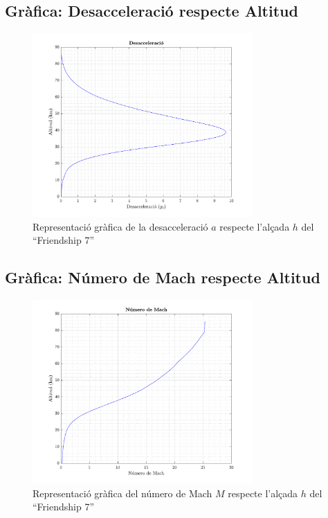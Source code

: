 \subsection{Gràfica: Desacceleració respecte Altitud}

\begin{figure}[h]
    \centering
    \includegraphics[width=0.75\textwidth]{imagenes/09_mercury_graficas/desacceleracio.pdf}
    \caption{Representació gràfica de la desacceleració $a$ respecte l'alçada $h$ del ``Friendship 7''}
    \label{fig:desacceleracio_merc}
\end{figure}


\newpage
\subsection{Gràfica: Número de Mach respecte Altitud}

\begin{figure}[h]
    \centering
    \includegraphics[width=0.75\textwidth]{imagenes/09_mercury_graficas/mach.pdf}
    \caption{Representació gràfica del número de Mach $M$ respecte l'alçada $h$ del ``Friendship 7''}
    \label{fig:mach_merc}
\end{figure}
